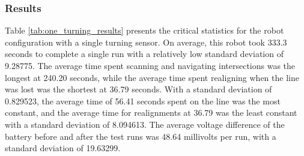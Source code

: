 \subsubsection{Results} \label{sec:turning_results}

Table \ref{tab:one_turning_results} presents the critical statistics for the robot configuration with a single turning sensor. On average, this robot took 333.3 seconds to complete a single run with a relatively low standard deviation of 9.28775. The average time spent scanning and navigating intersections was the longest at 240.20 seconds, while the average time spent realigning when the line was lost was the shortest at 36.79 seconds. With a standard deviation of 0.829523, the average time of 56.41 seconds spent on the line was the most constant, and the average time for realignments at 36.79 was the least constant with a standard deviation of 8.094613. 
The average voltage difference of the battery before and after the test runs was 48.64 millivolts per run, with a standard deviation of 19.63299.

\begin{table}[h!]
\caption{\TurningSensorRobot~- Summary of key statistics}
\label{tab:one_turning_results}

\end{table}

